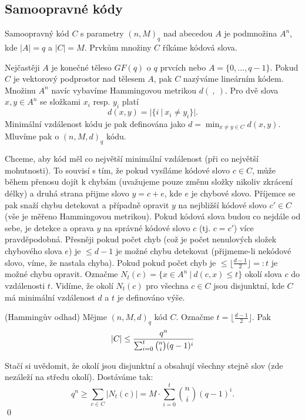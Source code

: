 \subsection{Samoopravné kódy}



\df Samoopravný kód $C$ s parametry $(n, M)_q$ nad abecedou $A$ je podmnožina $A^n$, kde $|A|=q$ a $|C|=M$. Prvkům množiny $C$ říkáme kódová slova.

Nejčastěji $A$ je konečné těleso $GF(q)$ o $q$ prvcích nebo $A=\{0, \dots, q-1\}$. Pokud $C$ je vektorový podprostor nad tělesem $A$, pak $C$ nazýváme lineárním kódem. Množinu $A^n$ navíc vybavíme Hammingovou metrikou $d(~,~)$. Pro dvě slova $x, y \in A^n$ se složkami $x_i$ resp. $y_i$ platí $$d(x, y)=|\{i~|~x_i\neq y_i\}|.$$ Minimální vzdálenost kódu je pak definována jako $d=\min_{x \neq y \in C} d(x, y)$. Mluvíme pak o $(n, M, d)_q$ kódu. 

Chceme, aby kód měl co největší minimální vzdálenost (při co největší mohutnosti). To souvisí s tím, že pokud vysíláme kódové slovo $c \in C$, může během přenosu dojít k chybám (uvažujeme pouze změnu složky nikoliv zkrácení délky) a druhá strana přijme slovo $y= c + e$, kde $e$ je chybové slovo. Příjemce se pak snaží chybu detekovat a případně opravit $y$ na nejbližší kódové slovo $c' \in C$ (vše je měřeno Hammingovou metrikou). Pokud kódová slova budou co nejdále od sebe, je detekce a oprava $y$ na správné kódové slovo $c$ (tj. $c=c'$) více pravděpodobná. Přesněji pokud počet chyb (což je počet nenulových složek chybového slova $e$) je $\leq d-1$ je možné chybu detekovat (přijmeme-li nekódové slovo, víme, že nastala chyba). Pokud pokud počet chyb je $\leq \lfloor\frac{d-1}{2}\rfloor=:t$ je možné chybu opravit. Označme $N_t(c)=\{x\in A^n~|~d(c, x)\leq t\}$ okolí slova $c$ do vzdálenosti $t$. Vidíme, že okolí $N_t(c)$ pro všechna $c\in C$ jsou disjunktní, kde $C$ má minimální vzdálenost $d$ a $t$ je definováno výše. 






\tv(Hammingův odhad) Mějme $(n, M, d)_q$ kód $C$. Označme $t=\lfloor\frac{d-1}{2}\rfloor$. Pak
\begin{align*}
	|C| \leq { q^n \over \sum_{i=0}^t \binom{n}{i} (q-1)^i }
\end{align*}

\dk Stačí si uvědomit, že okolí jsou disjunktní a obsahují všechny stejně slov (zde nezáleží na středu okolí). Dostáváme tak: 
$$q^n\geq \sum_{c\in C} |N_t(c)|=M\cdot \sum^{t}_{i=0} \binom{n}{i}(q-1)^i.$$
\qed


